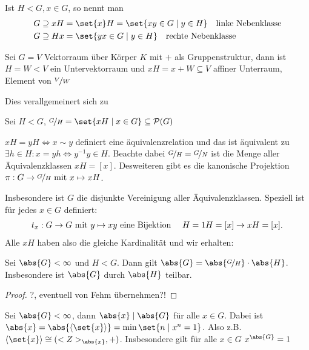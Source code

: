 \begin{definition}
	Ist $H < G, x \in G$, so nennt man
	\begin{align*}
	G \supseteq x H &= \set{x}H = \set{xy \in G \mid y \in H} \quad \text{linke Nebenklasse}\\
	G \supseteq H x &= \set{yx \in G \mid y \in H} \quad \text{rechte Nebenklasse}
	\end{align*}
\end{definition}
\begin{example}
	Sei $G = V$ Vektorraum über Körper $K$ mit $+$ als Gruppenstruktur, dann ist $H = W < V$ ein Untervektorraum und $xH = x + W \subseteq V$ affiner Unterraum, Element von $\lnkset{V}{W}$
\end{example}
Dies verallgemeinert sich zu
\begin{definition}
	Sei $H < G$, $\lnkset{G}{H} = \set{x H \mid x \in G} \subseteq \powerset(G)$
\end{definition}
\begin{remark}
	$xH = yH \Leftrightarrow x \sim y$ definiert eine äquivalenzrelation und das ist äquivalent zu $\exists h \in H: x = yh \Leftrightarrow y^{-1}y \in H$. Beachte dabei $\lnkset{G}{H} = \lnkset{G}{N}$ ist die Menge aller Äquivalenzklassen $xH = [x]$. Desweiteren gibt es die kanonische Projektion $\pi : G \to \lnkset{G}{H} \mit x \mapsto xH$.
\end{remark}
Insbesondere ist $G$ die disjunkte Vereinigung aller Äquivalenzklassen. Speziell ist für jedes $x \in G$ definiert:
\begin{align*}
	t_x : G \to G \mit y \mapsto xy \text{ eine Bijektion } \quad H = 1H = [x] \to xH = [x].
\end{align*}
Alle $xH$ haben also die gleiche Kardinalität und wir erhalten:
\begin{proposition}
	Sei $\abs{G} < \infty$ und $H < G$. Dann gilt $\abs{G} = \abs{\lnkset{G}{H}}\cdot \abs{H}$. Insbesondere ist $\abs{G}$ durch $\abs{H}$ teilbar.
\end{proposition}
\begin{proof}
	?, eventuell von Fehm übernehmen?!
\end{proof}
\begin{conclusion}
	Sei $\abs{G} < \infty$, dann $\abs{x} \mid \abs{G}$ für alle $x \in G$. Dabei ist $\abs{x} = \abs{\langle \set{x}\rangle} = \min\set{n \mid x^n = 1}$. Also z.B. $\langle \set{x} \rangle \cong (\Z_{\abs{x}},+)$. Insbesondere gilt für alle $x \in G$ $x^{\abs{G}} = 1$
\end{conclusion}
